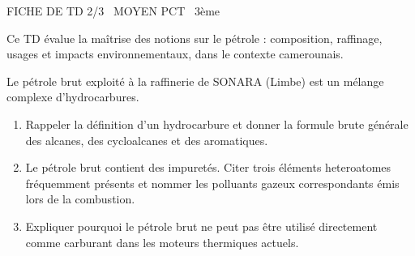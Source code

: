 \documentclass[11pt]{article}
\begin{document}
\begin{tcolorbox}[enhanced,colback=popink,colframe=popink,arc=10pt,boxrule=0pt,left=12pt,right=12pt,top=9pt,bottom=9pt]
{\color{white}\popxbold\small FICHE DE TD 2/3 \textbullet\ MOYEN \hfill PCT \textbullet\ 3ème\par}
\end{tcolorbox}
\vspace{4pt}
Ce TD évalue la maîtrise des notions sur le pétrole : composition, raffinage, usages et impacts environnementaux, dans le contexte camerounais.

\begin{exercice}
Le pétrole brut exploité à la raffinerie de SONARA (Limbe) est un mélange complexe d'hydrocarbures.
\begin{enumerate}
    \item Rappeler la définition d'un hydrocarbure et donner la formule brute générale des alcanes, des cycloalcanes et des aromatiques.
    \item Le pétrole brut contient des impuretés. Citer trois éléments heteroatomes fréquemment présents et nommer les polluants gazeux correspondants émis lors de la combustion.
    \item Expliquer pourquoi le pétrole brut ne peut pas être utilisé directement comme carburant dans les moteurs thermiques actuels.
\end{enumerate}
\end{exercice}
\end{document}
